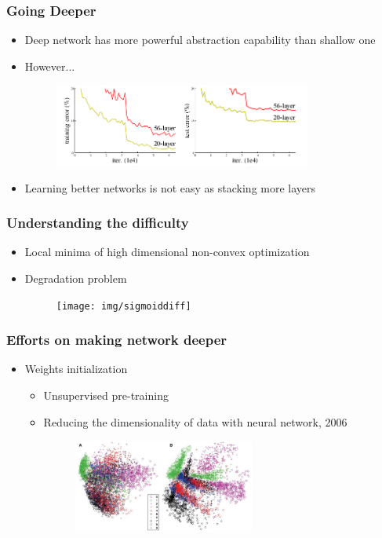 \documentclass[serif,mathserif]{beamer}
\begin{document}
\begin{frame}
  \frametitle{Going Deeper}
  \begin{itemize}
  \item Deep network has more powerful abstraction capability than shallow one
    \pause
  \item However...
    \begin{figure}
      \includegraphics[width=0.8\textwidth]{img/deepdifficulty}
    \end{figure}
  \item Learning better networks is not easy as stacking more layers
  \end{itemize}
\end{frame}

\begin{frame}
  \frametitle{Understanding the difficulty}
  \begin{itemize}
  \item Local minima of high dimensional non-convex optimization 
  \item Degradation problem
    \begin{figure}
      \centering
      \texttt{[image: img/sigmoiddiff]}
    \end{figure}    
  \end{itemize}
\end{frame}

\begin{frame}
  \frametitle{Efforts on making network deeper}
  \begin{itemize}
  \item Weights initialization
    \begin{itemize}
    \item Unsupervised pre-training
    \item Reducing the dimensionality of data with neural network, 2006
      \begin{figure}
        \includegraphics[width=0.6\textwidth]{img/PCAandNN}
      \end{figure}
    \end{itemize}
  \end{itemize}
\end{frame}
\end{document}
